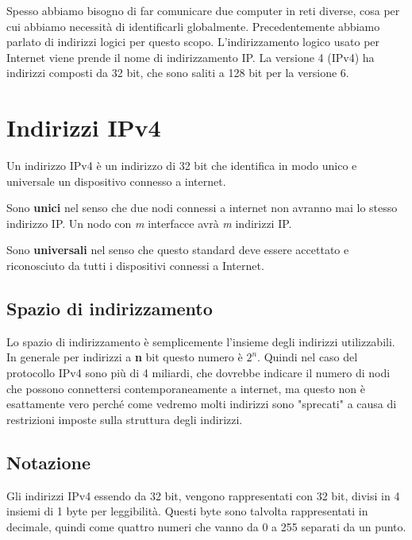 Spesso abbiamo bisogno di far comunicare due computer in reti diverse, cosa per cui abbiamo necessità di identificarli globalmente. Precedentemente abbiamo parlato di indirizzi logici per questo scopo. L'indirizzamento logico usato per Internet viene prende il nome di indirizzamento IP. La versione 4 (IPv4) ha indirizzi composti da 32 bit, che sono saliti a 128 bit per la versione 6.

\section{Indirizzi IPv4}
    Un indirizzo IPv4 è un indirizzo di 32 bit che identifica in modo unico e universale un dispositivo connesso a internet.
    
    Sono \textbf{unici} nel senso che due nodi connessi a internet non avranno mai lo stesso indirizzo IP. Un nodo con \textit{m} interfacce avrà \textit{m} indirizzi IP.
    
    Sono \textbf{universali} nel senso che questo standard deve essere accettato e riconosciuto da tutti i dispositivi connessi a Internet.
    
    \subsection{Spazio di indirizzamento}
        Lo spazio di indirizzamento è semplicemente l'insieme degli indirizzi utilizzabili. In generale per indirizzi a \textbf{n} bit questo numero è $2^n$. Quindi nel caso del protocollo IPv4 sono più di 4 miliardi, che dovrebbe indicare il numero di nodi che possono connettersi contemporaneamente a internet, ma questo non è esattamente vero perché come vedremo molti indirizzi sono "sprecati" a causa di restrizioni imposte sulla struttura degli indirizzi.
        
    \subsection{Notazione}
        Gli indirizzi IPv4 essendo da 32 bit, vengono rappresentati con 32 bit, divisi in 4 insiemi di 1 byte per leggibilità. Questi byte sono talvolta rappresentati in decimale, quindi come quattro numeri che vanno da 0 a 255 separati da un punto.
    
